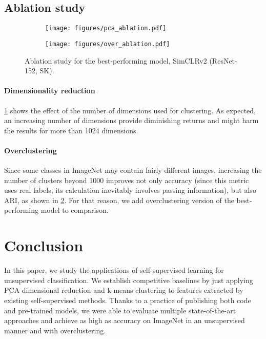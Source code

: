 \documentclass[runningheads]{llncs}
\begin{document}
\subsection{Ablation study}


\begin{figure*}
	\centering
	\begin{subfigure}[b]{0.48\linewidth}
		\texttt{[image: figures/pca\_ablation.pdf]}
		\label{fig:pca}
	\end{subfigure}
	\begin{subfigure}[b]{0.48\linewidth}
		\texttt{[image: figures/over\_ablation.pdf]}
		\label{fig:over}
	\end{subfigure}
	\caption{Ablation study for the best-performing model, SimCLRv2 (ResNet-152, SK).
	}
	\label{fig:ablation}
\end{figure*}

\paragraph{Dimensionality reduction}
\cref{fig:pca} shows the effect of the number of dimensions used for clustering. As expected, an increasing number of dimensions provide diminishing returns and might harm the results for more than 1024 dimensions.
\paragraph{Overclustering}
Since some classes in ImageNet may contain fairly different images, increasing the number of clusters beyond 1000 improves not only accuracy (since this metric uses real labels, its calculation inevitably involves passing information), but also ARI, as shown in \cref{fig:over}. For that reason, we add  overclustering version of the best-performing model to comparison. \section{Conclusion}
\label{sec:conclusion}
In this paper, we study the applications of self-supervised learning for unsupervised classification. We establish competitive baselines by just applying PCA dimensional reduction and k-means clustering to features extracted by existing self-supervised methods. Thanks to a practice of publishing both code and pre-trained models, we were able to evaluate multiple state-of-the-art approaches and achieve as high as  accuracy on ImageNet in an unsupervised manner and  with overclustering. 
\end{document}
